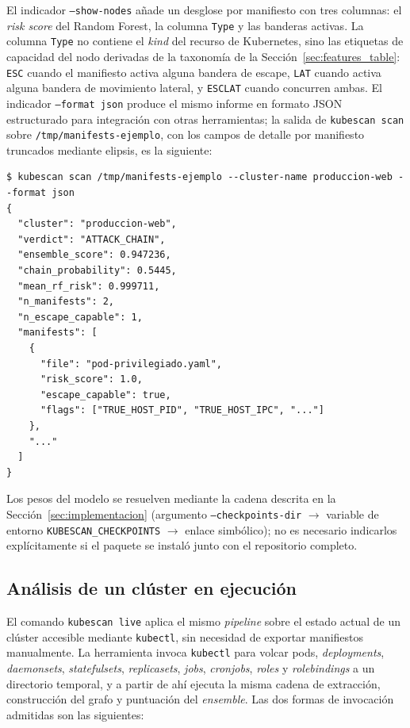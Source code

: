 El indicador \texttt{--show-nodes} añade un desglose por manifiesto con tres
columnas: el \textit{risk score} del Random Forest, la columna \texttt{Type} y las
banderas activas. La columna \texttt{Type} no contiene el \textit{kind} del recurso
de Kubernetes, sino las etiquetas de capacidad del nodo derivadas de la
taxonomía de la Sección~\ref{sec:features_table}: \texttt{ESC} cuando el manifiesto
activa alguna bandera de escape, \texttt{LAT} cuando activa alguna bandera de
movimiento lateral, y \texttt{ESCLAT} cuando concurren ambas. El indicador
\texttt{--format json} produce el mismo informe en formato \ac{JSON}
estructurado para integración con otras herramientas; la salida de
\texttt{kubescan scan} sobre \texttt{/tmp/manifests-ejemplo}, con los campos de
detalle por manifiesto truncados mediante elipsis, es la siguiente:

{\footnotesize\begin{verbatim}
$ kubescan scan /tmp/manifests-ejemplo --cluster-name produccion-web --format json
{
  "cluster": "produccion-web",
  "verdict": "ATTACK_CHAIN",
  "ensemble_score": 0.947236,
  "chain_probability": 0.5445,
  "mean_rf_risk": 0.999711,
  "n_manifests": 2,
  "n_escape_capable": 1,
  "manifests": [
    {
      "file": "pod-privilegiado.yaml",
      "risk_score": 1.0,
      "escape_capable": true,
      "flags": ["TRUE_HOST_PID", "TRUE_HOST_IPC", "..."]
    },
    "..."
  ]
}
\end{verbatim}}

Los pesos del modelo se resuelven mediante la cadena descrita en la
Sección~\ref{sec:implementacion} (argumento \texttt{--checkpoints-dir}
\(\to\) variable de entorno \texttt{KUBESCAN\_CHECKPOINTS} \(\to\) enlace
simbólico); no es necesario indicarlos explícitamente si el paquete se instaló
junto con el repositorio completo.

\subsection{Análisis de un clúster en ejecución}

El comando \texttt{kubescan live} aplica el mismo \textit{pipeline} sobre el
estado actual de un clúster accesible mediante \texttt{kubectl}, sin necesidad
de exportar manifiestos manualmente. La herramienta invoca \texttt{kubectl} para
volcar pods, \textit{deployments}, \textit{daemonsets},
\textit{statefulsets}, \textit{replicasets}, \textit{jobs}, \textit{cronjobs},
\textit{roles} y \textit{rolebindings} a un directorio temporal, y a partir de
ahí ejecuta la misma cadena de extracción, construcción del grafo y puntuación
del \textit{ensemble}. Las dos formas de invocación admitidas son las
siguientes:

